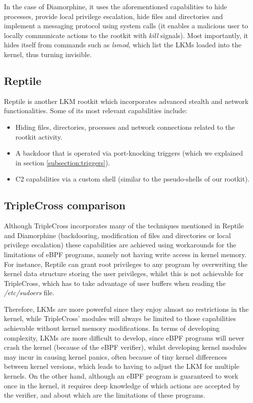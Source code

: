 In the case of Diamorphine, it uses the aforementioned capabilities to hide
processes, provide local privilege escalation, hide files and directories
and implement a messaging protocol using system calls (it enables a
malicious user to locally communicate actions to the rootkit with
\textit{kill} signals). Most importantly, it hides itself from commands
such as \textit{lsmod}, which list the LKMs loaded into the kernel, thus
turning invisible.

\subsection{Reptile}
Reptile \cite{reptile_github} is another LKM rootkit which incorporates
advanced stealth and network functionalities. Some of its most relevant
capabilities include:
\begin{itemize}
\item Hiding files, directories, processes and network connections related to the rootkit activity.
\item A backdoor that is operated via port-knocking triggers (which we explained in section \ref{subsection:triggers}).
\item C2 capabilities via a custom shell (similar to the pseudo-shells of our rootkit).
\end{itemize}

\subsection{TripleCross comparison}
Although TripleCross incorporates many of the techniques mentioned in
Reptile and Diamorphine (backdooring, modification of files and directories
or local privilege escalation) these capabilities are achieved using
workarounds for the limitations of eBPF programs, namely not having write
access in kernel memory. For instance, Reptile can grant root privileges to
any program by overwriting the kernel data structure storing the user
privileges, whilst this is not achievable for TripleCross, which has to
take advantage of user buffers when reading the \textit{/etc/sudoers}
file.

Therefore, LKMs are more powerful since they enjoy almost no restrictions
in the kernel, while TripleCross' modules will always be limited to those
capabilities achievable without kernel memory modifications. In terms of
developing complexity, LKMs are more difficult to develop, since eBPF
programs will never crash the kernel (because of the eBPF verifier), whilst
developing kernel modules may incur in causing kernel panics, often because
of tiny kernel differences between kernel versions, which leads to having
to adjust the LKM for multiple kernels. On the other hand, although an eBPF
program is guaranteed to work once in the kernel, it requires deep
knowledge of which actions are accepted by the verifier, and about which
are the limitations of these programs.

